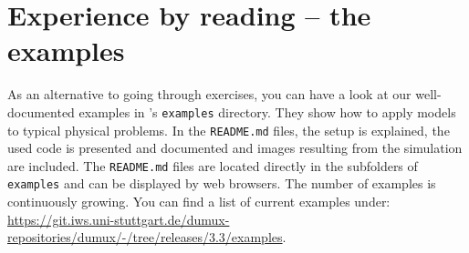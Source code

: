 \section{Experience \Dumux by reading -- the \Dumux examples}
As an alternative to going through exercises, you can have a look at our well-documented \Dumux examples in \Dumux's \texttt{examples} directory. They show how to apply \Dumux models to typical physical problems. In the \texttt{README.md} files, the setup is explained, the used code is presented and documented and images resulting from the simulation are included. The \texttt{README.md} files are located directly in the subfolders of \texttt{examples} and can be displayed by web browsers. The number of examples is continuously growing.
You can find a list of current examples under: \url{https://git.iws.uni-stuttgart.de/dumux-repositories/dumux/-/tree/releases/3.3/examples}.
